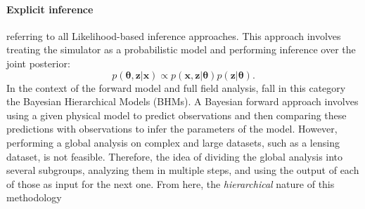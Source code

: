 \documentclass{aa}
\begin{document}
\paragraph{\textbf{Explicit inference}} referring to all Likelihood-based inference approaches.  
This approach involves treating the simulator as a probabilistic model and performing inference over the joint posterior:
\begin{equation}
        p(\bm{\theta},\bm{z}|\bm{x})\propto  p(\bm{x},\bm{z}|\bm{\theta}) p(\bm{z}|\bm{\theta}).
\end{equation}
In the context of the forward model and full field analysis, fall in this category the Bayesian Hierarchical Models (BHMs).
A Bayesian forward approach involves using a given physical model to predict observations and then comparing these predictions with observations to infer the parameters of the model.
However, performing a global analysis on complex and large datasets, such as a lensing dataset, is not feasible. Therefore, the idea of dividing the global analysis into several subgroups, analyzing them in multiple steps, and using the output of each of those as input for the next one. From here, the \textit{hierarchical} nature of this methodology
\end{document}
